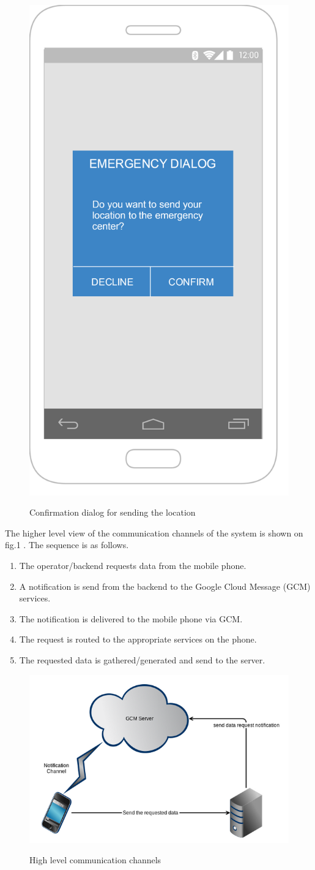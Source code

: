 \documentclass{article}
\begin{document}
	
	\begin{figure}[H]
		\centering
		\includegraphics[width=.4\textwidth]{"AutomaticVideoSending/send_location_confirmation"}
		
		Confirmation dialog for sending the location
		\vspace{-20pt}
	\end{figure}

\pagebreak
The higher level view of the communication channels of the system is shown on fig.1 . The sequence is as follows.
\begin{enumerate}
\item The operator/backend requests data from the mobile phone.
\item A notification is send from the backend to the Google Cloud Message (GCM) services.
\item The notification is delivered to the mobile phone via GCM.
\item The request is routed to the appropriate services on the phone.
\item The requested data is gathered/generated and send to the server.
\end{enumerate}

	\begin{figure}[H]
		\centering
		\includegraphics[width=1\textwidth]{"AutomaticVideoSending/gcm"}
		
		High level communication channels
	\end{figure}
	
\end{document}
